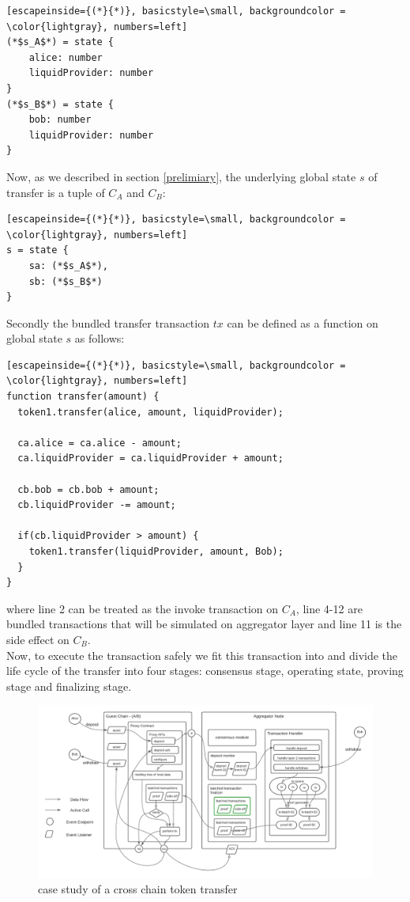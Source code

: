 \documentclass[acmtog, natbib=false]{acmart}
\begin{document}
\begin{lstlisting}[escapeinside={(*}{*)}, basicstyle=\small, backgroundcolor = \color{lightgray}, numbers=left]
(*$s_A$*) = state {
    alice: number
    liquidProvider: number
}
(*$s_B$*) = state {
    bob: number
    liquidProvider: number
}
\end{lstlisting}
Now, as we described in section \ref{prelimiary}, the underlying global state $s$ of transfer is a tuple of $C_A$ and $C_B$:
\begin{lstlisting}[escapeinside={(*}{*)}, basicstyle=\small, backgroundcolor = \color{lightgray}, numbers=left]
s = state {
    sa: (*$s_A$*),
    sb: (*$s_B$*)
}
\end{lstlisting}
Secondly the bundled transfer transaction $tx$ can be defined as a function on global state $s$ as follows:
\begin{lstlisting}[escapeinside={(*}{*)}, basicstyle=\small, backgroundcolor = \color{lightgray}, numbers=left]
function transfer(amount) {
  token1.transfer(alice, amount, liquidProvider);
  
  ca.alice = ca.alice - amount;
  ca.liquidProvider = ca.liquidProvider + amount;
  
  cb.bob = cb.bob + amount;
  cb.liquidProvider -= amount;
  
  if(cb.liquidProvider > amount) {
    token1.transfer(liquidProvider, amount, Bob);
  }
}
\end{lstlisting}
where line 2 can be treated as the invoke transaction on $C_A$, line 4-12 are bundled transactions that will be simulated on aggregator layer and line 11 is the side effect on $C_B$.\\
\newline
Now, to execute the transaction safely we fit this transaction into \dprotocol and divide the life cycle of the transfer into four stages: consensus stage, operating state, proving stage and finalizing stage.
\begin{figure}[!ht]
\caption{case study of a cross chain token transfer}
\label{case-study}
\includegraphics[scale=0.6]{case-study}
\end{figure}
\end{document}
